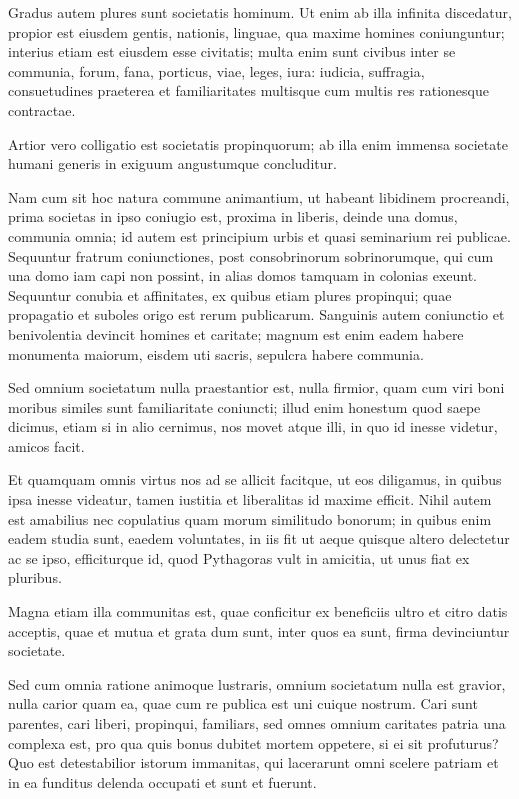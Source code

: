  Gradus autem plures sunt societatis hominum. Ut enim ab illa infinita discedatur, propior est eiusdem gentis, nationis, linguae, qua maxime homines coniunguntur; interius etiam est eiusdem esse civitatis; multa enim sunt civibus inter se communia, forum, fana, porticus, viae, leges, iura: iudicia, suffragia, consuetudines praeterea et familiaritates multisque cum multis res rationesque contractae.

Artior vero colligatio est societatis propinquorum; ab illa enim immensa societate humani generis in exiguum angustumque concluditur. 

 Nam cum sit hoc natura commune animantium, ut habeant libidinem procreandi, prima societas in ipso coniugio est, proxima in liberis, deinde una domus, communia omnia; id autem est principium urbis et quasi seminarium rei publicae. Sequuntur fratrum coniunctiones, post consobrinorum sobrinorumque, qui cum una domo iam capi non possint, in alias domos tamquam in colonias exeunt. Sequuntur conubia et affinitates, ex quibus etiam plures propinqui; quae propagatio et suboles origo est rerum publicarum. Sanguinis autem coniunctio et benivolentia devincit homines et caritate;  magnum est enim eadem habere monumenta maiorum, eisdem uti sacris, sepulcra habere communia.

Sed omnium societatum nulla praestantior est, nulla firmior, quam cum viri boni moribus similes sunt familiaritate coniuncti; illud enim honestum quod saepe dicimus, etiam si in alio cernimus, nos movet atque illi, in quo id inesse videtur, amicos facit.


 Et quamquam omnis virtus nos ad se allicit facitque, ut eos diligamus, in quibus ipsa inesse videatur, tamen iustitia et liberalitas id maxime efficit. Nihil autem est amabilius nec copulatius quam morum similitudo bonorum; in quibus enim eadem studia sunt, eaedem voluntates, in iis fit ut aeque quisque altero delectetur ac se ipso, efficiturque id, quod Pythagoras vult in amicitia, ut unus fiat ex pluribus.

Magna etiam illa communitas est, quae conficitur ex beneficiis ultro et citro datis acceptis, quae et mutua et grata dum sunt, inter quos ea sunt, firma devinciuntur societate.
 

 Sed cum omnia ratione animoque lustraris, omnium societatum nulla est gravior, nulla carior quam ea, quae cum re publica est uni cuique nostrum. Cari sunt parentes, cari liberi, propinqui, familiars, sed omnes omnium caritates patria una complexa est, pro qua quis bonus dubitet mortem oppetere, si ei sit profuturus? Quo est detestabilior istorum immanitas, qui lacerarunt omni scelere patriam et in ea funditus delenda occupati et sunt et fuerunt.

